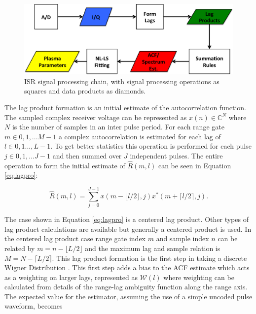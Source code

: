 \begin{figure}[!t]
\centering
\includegraphics[width=6in]{datastackchain}
\caption{ISR signal processing chain, with signal processing operations as squares and data products as diamonds.}
\label{fig:chain}
\end{figure}


The lag product formation is an initial estimate of the autocorrelation function. The sampled complex receiver voltage can be represented as $x(n) \in\mathbb{C}^N$ where $N$ is the number of samples in an inter pulse period. For each range gate $m\in 0,1,...M-1$ a complex autocorrelation is estimated for each lag of $l \in 0,1...,L-1$.  To get better statistics this operation is performed for each pulse $j\in 0,1,...J-1$ and then summed over $J$ independent pulses. The entire operation to form the initial estimate of $\widehat{R}(m,l)$ can be seen in Equation \ref{eq:lagpro}:

\begin{equation}
\label{eq:lagpro}
\widehat{R}(m,l) = \displaystyle\sum\limits_{j=0}^{J-1} x(m-\lfloor l/2\rfloor,j)x^*(m+\lceil l/2 \rceil,j).
\end{equation}

The case shown in Equation \ref{eq:lagpro} is a centered lag product.  Other types of lag product calculations are available but generally a centered product is used. In the centered lag product case range gate index $m$ and sample index $n$ can be related by $m=n-\lfloor L/2\rfloor$ and the maximum lag and sample relation is $M=N-\lceil L/2 \rceil$.  This lag product formation is the first step in taking a discrete Wigner Distribution \cite{TFAcohen}. This first step adds a bias to the ACF estimate which acts as a weighting on larger lags, represented as $\mathcal{W}(l)$ where weighting can be calculated from details of the range-lag ambiguity function along the range axis. The expected value for the estimator, assuming the use of a simple uncoded pulse waveform, becomes

